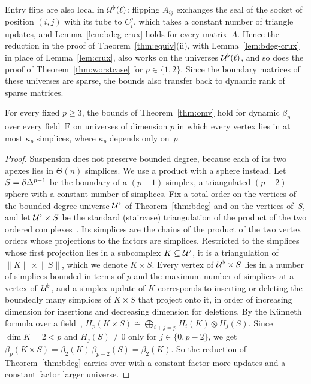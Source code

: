 Entry flips are also local in $\mathcal{U}^{\flat}(\ell)$: flipping $A_{ij}$ exchanges the seal of the socket of position $(i,j)$ with its tube to $C_i^j$, which takes a constant number of triangle updates, and Lemma~\ref{lem:bdeg-crux} holds for every matrix~$A$.
Hence the reduction in the proof of Theorem~\ref{thm:equiv}(ii), with Lemma~\ref{lem:bdeg-crux} in place of Lemma~\ref{lem:crux}, also works on the universes $\mathcal{U}^{\flat}(\ell)$, and so does the proof of Theorem~\ref{thm:worstcase} for $p\in\{1,2\}$.
Since the boundary matrices of these universes are sparse, the bounds also transfer back to dynamic rank of sparse matrices.

\begin{corollary}\label{cor:bdeg-allp}
For every fixed $p\ge3$, the bounds of Theorem~\ref{thm:omv} hold for dynamic $\beta_p$ over every field~$\mathbb{F}$ on universes of dimension $p$ in which every vertex lies in at most $\kappa_p$ simplices, where $\kappa_p$ depends only on~$p$.
\end{corollary}

\begin{proof}
Suspension does not preserve bounded degree, because each of its two apexes lies in $\Theta(n)$ simplices.
We use a product with a sphere instead.
Let $S=\partial\Delta^{p-1}$ be the boundary of a $(p-1)$-simplex, a triangulated $(p-2)$-sphere with a constant number of simplices.
Fix a total order on the vertices of the bounded-degree universe $\mathcal{U}^{\flat}$ of Theorem~\ref{thm:bdeg} and on the vertices of~$S$, and let $\mathcal{U}^{\flat}\times S$ be the standard (staircase) triangulation of the product of the two ordered complexes~\cite{Mun84}.
Its simplices are the chains of the product of the two vertex orders whose projections to the factors are simplices.
Restricted to the simplices whose first projection lies in a subcomplex $K\subseteq\mathcal{U}^{\flat}$, it is a triangulation of $\lVert K\rVert\times\lVert S\rVert$, which we denote $K\times S$.
Every vertex of $\mathcal{U}^{\flat}\times S$ lies in a number of simplices bounded in terms of $p$ and the maximum number of simplices at a vertex of~$\mathcal{U}^{\flat}$, and a simplex update of $K$ corresponds to inserting or deleting the boundedly many simplices of $K\times S$ that project onto it, in order of increasing dimension for insertions and decreasing dimension for deletions.
By the K\"unneth formula over a field~\cite[Section~3.B]{Hat02}, $H_p(K\times S)\cong\bigoplus_{i+j=p}H_i(K)\otimes H_j(S)$.
Since $\dim K=2<p$ and $H_j(S)\ne0$ only for $j\in\{0,p-2\}$, we get $\beta_p(K\times S)=\beta_2(K)\,\beta_{p-2}(S)=\beta_2(K)$.
So the reduction of Theorem~\ref{thm:bdeg} carries over with a constant factor more updates and a constant factor larger universe.
\end{proof}


